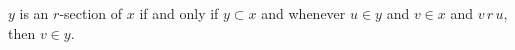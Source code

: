 $y$ is an $r$-section of $x$ if and only if $y \subset x$ and whenever $u \in y$ and $v \in x$ and $v \, r \, u$, then $v \in y$.

